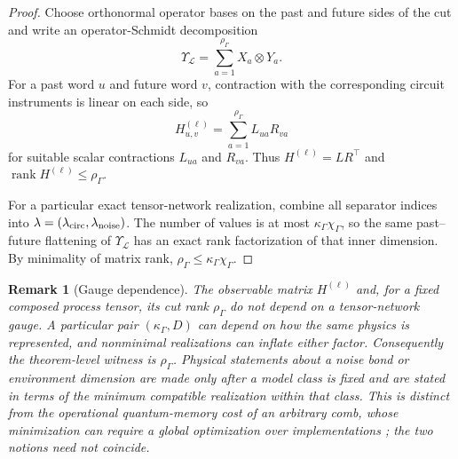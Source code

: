 \documentclass[11pt]{article}
\newtheorem{remark}[theorem]{Remark}
\newcommand{\rank}{\operatorname{rank}}
\begin{document}
\begin{proof}
Choose orthonormal operator bases on the past and future sides of the cut and write an operator-Schmidt decomposition
\begin{equation}
    \Upsilon_{\mathcal L}=\sum_{a=1}^{\rho_\Gamma} X_a\otimes Y_a.
    \label{eq:osrdecomp}
\end{equation}
For a past word $u$ and future word $v$, contraction with the corresponding circuit instruments is linear on each side, so
\begin{equation}
    H^{(\ell)}_{u,v}=\sum_{a=1}^{\rho_\Gamma} L_{ua}R_{va}
    \label{eq:cutfactorization}
\end{equation}
for suitable scalar contractions $L_{ua}$ and $R_{va}$. Thus $H^{(\ell)}=LR^\top$ and $\rank H^{(\ell)}\le\rho_\Gamma$.

For a particular exact tensor-network realization, combine all separator indices into $\lambda=(\lambda_{\rm circ},\lambda_{\rm noise})$. The number of values is at most $\kappa_\Gamma\chi_\Gamma$, so the same past--future flattening of $\Upsilon_{\mathcal L}$ has an exact rank factorization of that inner dimension. By minimality of matrix rank, $\rho_\Gamma\le\kappa_\Gamma\chi_\Gamma$.
\end{proof}

\begin{remark}[Gauge dependence]
The observable matrix $H^{(\ell)}$ and, for a fixed composed process tensor, its cut rank $\rho_\Gamma$ do not depend on a tensor-network gauge. A particular pair $(\kappa_\Gamma,D)$ can depend on how the same physics is represented, and nonminimal realizations can inflate either factor. Consequently the theorem-level witness is $\rho_\Gamma$. Physical statements about a noise bond or environment dimension are made only after a model class is fixed and are stated in terms of the \emph{minimum compatible realization} within that class. This is distinct from the operational quantum-memory cost of an arbitrary comb, whose minimization can require a global optimization over implementations \cite{bisio2011memory}; the two notions need not coincide.
\end{remark}
\end{document}
